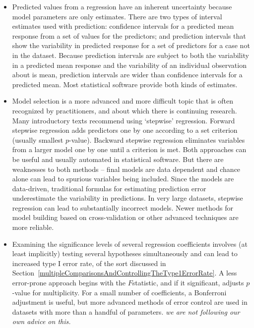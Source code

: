 \begin{itemize}
	
	\item Predicted values from a regression have an inherent uncertainty because model parameters are only estimates.  There are two types of interval estimates used with prediction: confidence intervals for a predicted mean response from a set of values for the predictors; and prediction intervals that show the variability in predicted response for a set of predictors for a case not in the dataset.  Because prediction intervals are subject to both the variability in a predicted mean response and the variability of an individual observation about is mean, prediction intervals are wider than confidence intervals for a predicted mean.  Most statistical software provide both kinds of estimates.
	
	\item Model selection is a more advanced and more difficult topic that is often recognized by practitioners, and about which there is continuing research.  Many introductory texts recommend using `stepwise' regression.  Forward stepwise regression adds predictors one by one according to a set criterion (usually smallest $p$-value).  Backward stepwise regression eliminates variables from a larger model one by one until a criterion is met. Both approaches can be useful and usually automated in statistical software.  But there are weaknesses to both methods -- final models are data dependent and chance alone can lead to spurious variables being included.  Since the models are data-driven, traditional formulas for estimating prediction error underestimate the variability in predictions. In very large datasets, stepwise regression can lead to substantially incorrect models. Newer methods for model building based on cross-validation or other advanced techniques are more reliable.
	
	\item  Examining the significance levels of several regression coefficients involves (at least implicitly) testing several hypotheses simultaneously and can lead to increased type I error rate, of the sort discussed in Section~\ref{multipleComparisonsAndControllingTheType1ErrorRate}.  A less error-prone approach begins with the $F$statistic, and if it significant, adjusts $p$-value for multiplicity. For a small number of coefficients, a Bonferroni adjustment is useful, but more advanced methods of error control are used in datasets with more than a handful of parameters.  \textit{we are not following our own advice on this.}
	
\end{itemize}

